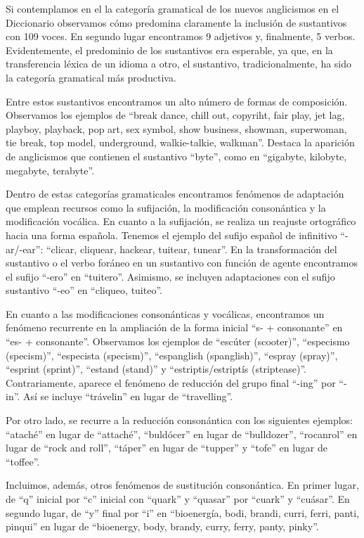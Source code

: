 \documentclass{textolivre}
\begin{document}
Si contemplamos en el  la categoría gramatical de los nuevos anglicismos en el Diccionario observamos cómo predomina claramente la inclusión de sustantivos con 109 voces. En segundo lugar encontramos 9 adjetivos y, finalmente, 5 verbos. Evidentemente, el predominio de los sustantivos era esperable, ya que, en la transferencia léxica de un idioma a otro, el sustantivo, tradicionalmente, ha sido la categoría gramatical más productiva.

Entre estos sustantivos encontramos un alto número de formas de composición. Observamos los ejemplos de “break dance, chill out, copyriht, fair play, jet lag, playboy, playback, pop art, sex symbol, show business, showman, superwoman, tie break, top model, underground, walkie-talkie, walkman”. Destaca la aparición de anglicismos que contienen el sustantivo “byte”, como en “gigabyte, kilobyte, megabyte, terabyte”.

Dentro de estas categorías gramaticales encontramos fenómenos de adaptación que emplean recursos como la sufijación, la modificación consonántica y la modificación vocálica. En cuanto a la sufijación, se realiza un reajuste ortográfico hacia una forma española. Tenemos el ejemplo del sufijo español de infinitivo “-ar/-ear”: “clicar, cliquear, hackear, tuitear, tunear”. En la transformación del sustantivo o el verbo foráneo en un sustantivo con función de agente encontramos el sufijo “-ero” en “tuitero”. Asimismo, se incluyen adaptaciones con el sufijo sustantivo “-eo” en “cliqueo, tuiteo”.

En cuanto a las modificaciones consonánticas y vocálicas, encontramos un fenómeno recurrente en la ampliación de la forma inicial “s- + consonante” en “es- + consonante”. Observamos los ejemplos de “escúter (scooter)”, “especismo (specism)”, “especista (specism)”, “espanglish (spanglish)”, “espray (spray)”, “esprint (sprint)”, “estand (stand)” y “estriptis/estriptís (striptease)”. Contrariamente, aparece el fenómeno de reducción del grupo final “-ing” por “-in”. Así se incluye “trávelin” en lugar de “travelling”.

Por otro lado, se recurre a la reducción consonántica con los siguientes ejemplos: “ataché” en lugar de “attaché”, “buldócer” en lugar de “bulldozer”, “rocanrol” en lugar de “rock and roll”, “táper” en lugar de “tupper” y “tofe” en lugar de “toffee”.

Incluimos, además, otros fenómenos de sustitución consonántica. En primer lugar, de “q” inicial por “c” inicial con “quark” y “quasar” por “cuark” y “cuásar”. En segundo lugar, de “y” final por “i” en “bioenergía, bodi, brandi, curri, ferri, panti, pinqui” en lugar de “bioenergy, body, brandy, curry, ferry, panty, pinky”.
\end{document}

